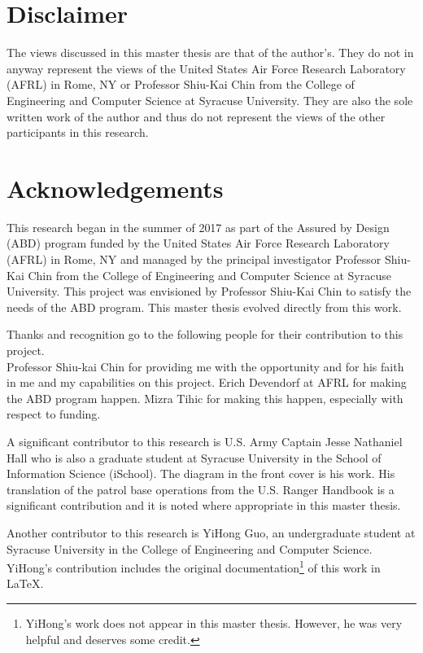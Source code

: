 \documentclass[../main/main.tex]{subfiles}
\begin{document}

\section*{Disclaimer}
The views discussed in this master thesis are that of the author's.  They do not in anyway represent the views of the United States Air Force Research Laboratory (AFRL) in Rome, NY or  Professor Shiu-Kai Chin from the College of Engineering and Computer Science at Syracuse University.  They are also the sole written work of the author and thus do not represent the views of the other participants in this research.

\cleardoublepage

\section*{Acknowledgements}
This research began in the summer of 2017 as part of the Assured by Design (ABD) program funded by the United States Air Force Research Laboratory (AFRL) in Rome, NY and managed by the principal investigator Professor Shiu-Kai Chin from the College of Engineering and Computer Science at Syracuse University.  This project was envisioned by Professor Shiu-Kai Chin to satisfy the needs of the ABD program.  This master thesis evolved directly from this work.

Thanks and recognition go to the following people for their contribution to this project.\\
Professor Shiu-kai Chin for providing me with the opportunity and for his faith in me and my capabilities on this project.  Erich Devendorf at AFRL for making the ABD program happen. Mizra Tihic for making this happen, especially with respect to funding.

A significant contributor to this research is U.S. Army Captain Jesse Nathaniel Hall who is also a graduate student at Syracuse University in the School of Information Science (iSchool).  The diagram in the front cover is his work.  His translation of the patrol base operations from the U.S. Ranger Handbook is a significant contribution and it is noted where appropriate in this master thesis.

Another contributor to this research is YiHong Guo, an undergraduate student at Syracuse University in the College of Engineering and Computer Science. YiHong's contribution includes the original documentation\footnote{YiHong's work does not appear in this master thesis.  However, he was very helpful and deserves some credit.} of this work in LaTeX.  
\end{document}
